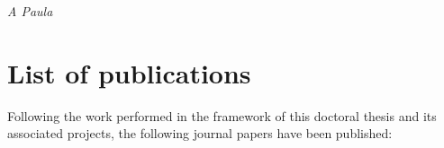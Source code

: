 \documentclass[final,twoside,11pt]{book}
\makeatletter
\numberwithin{equation}{section}
\numberwithin{figure}{chapter}
\numberwithin{table}{chapter}
\def\cleardoublepage{\clearpage\if@twoside \ifodd\c@page\else
  \hbox{}
  \thispagestyle{empty}
  \newpage
  \if@twocolumn\hbox{}\newpage\fi\fi\fi}
\makeatother
\begin{document}







\null\vspace{5cm}
\hfill\textit{A Paula}
\cleardoublepage



\chapter*{List of publications}

Following the work performed in the framework of this doctoral thesis and its associated projects, the following journal papers have been published:

\renewcommand*{\bibfont}{\small}
\renewcommand*{\mkbibacro}[1]{#1}
\begingroup
{}
\nocite{broatch2014methodology,broatch2015simulations,torregrosa2014aco,broatch2016numerical,torregrosa2016experimental}
\printbibliography[keyword=MyOwn,heading=none]
\endgroup
\end{document}
